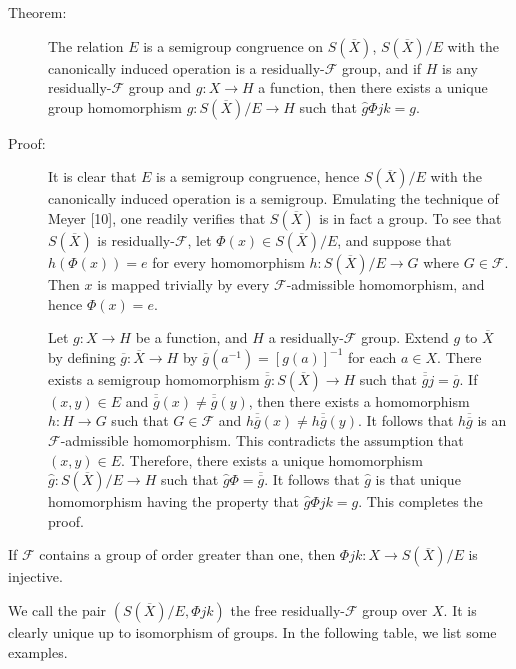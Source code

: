 \documentclass{article}
\begin{document}
\begin{description}

\item[Theorem:] The relation $E$ is a semigroup congruence on $S(\overline{X})$, $S(\overline{X})/E$ with the canonically induced operation is a residually-$\mathcal{F}$ group, and if $H$ is any residually-$\mathcal{F}$ group and $g: X \rightarrow H$ a function, then there exists a unique group homomorphism $g: S(\overline{X})/E \rightarrow H$ such that $\hat{g} \Phi j k = g$.

\item[Proof:] It is clear that $E$ is a semigroup congruence, hence $S(\overline{X})/E$ with the canonically induced operation is a semigroup. Emulating the technique of Meyer [10], one readily verifies that $S(\overline{X})$ is in fact a group. To see that $S(\overline{X})$ is residually-$\mathcal{F}$, let $\Phi(x) \in S(\overline{X})/E$, and suppose that $h(\Phi(x)) = e$ for every homomorphism $h: S(\overline{X})/E \rightarrow G$ where $G \in \mathcal{F}$. Then $x$ is mapped trivially by every $\mathcal{F}$-admissible homomorphism, and hence $\Phi(x) = e$.

  Let $g:X \rightarrow H$ be a function, and $H$ a residually-$\mathcal{F}$ group. Extend $g$ to $\overline{X}$ by defining $\overline{g}: \overline{X} \rightarrow H$ by $\overline{g}(a^{-1}) = [g(a)]^{-1}$ for each $a \in X$. There exists a semigroup homomorphism $\overline{\overline{g}}: S(\overline{X}) \rightarrow H$ such that $\overline{\overline{g}}j = \overline{g}$. If $(x,y) \in E$ and $\overline{\overline{g}}(x) \ne \overline{\overline{g}}(y)$, then there exists a homomorphism $h: H \rightarrow G$ such that $G \in \mathcal{F}$ and $h \overline{\overline{g}}(x) \ne h \overline{\overline{g}}(y)$. It follows that $h \overline{\overline{g}}$ is an $\mathcal{F}$-admissible homomorphism. This contradicts the assumption that $(x,y) \in E$. Therefore, there exists a unique homomorphism $\hat{g}: S(\overline{X})/E \rightarrow H$ such that $\hat{g}\Phi = \overline{\overline{g}}$. It follows that $\hat{g}$ is that unique homomorphism having the property that $\hat{g}\Phi jk = g$. This completes the proof.

\end{description}

If $\mathcal{F}$ contains a group of order greater than one, then $\Phi jk:X \rightarrow S(\overline{X})/E$ is injective.

We call the pair $(S(\overline{X})/E, \Phi jk)$ the free residually-$\mathcal{F}$ group over $X$. It is clearly unique up to isomorphism of groups. In the following table, we list some examples.
\end{document}
